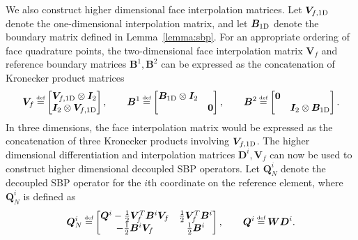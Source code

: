 \documentclass[onefignum,onetabnum,final]{siamart171218}
\newcommand\myeq{\mathrel{\stackrel{\makebox[0pt]{\mbox{\normalfont\tiny def}}}{=}}}
\begin{document}
We also construct higher dimensional face interpolation matrices.  Let $\bm{V}_{f, {\rm 1D}}$ denote the one-dimensional interpolation matrix, and let $\bm{B}_{\rm 1D}$ denote the boundary matrix defined in Lemma~\ref{lemma:sbp}.  For an appropriate ordering of face quadrature points, the two-dimensional face interpolation matrix $\bm{V}_f$ and reference boundary matrices ${\bm{B}}^1, {\bm{B}}^2$ can be expressed as the concatenation of Kronecker product matrices
\[
\bm{V}_f \myeq \begin{bmatrix}
\bm{V}_{f, {\rm 1D}} \otimes \bm{I}_{2}\\
\bm{I}_{2} \otimes \bm{V}_{f, {\rm 1D}} 
\end{bmatrix}, \qquad 
{\bm{B}}^1 \myeq \begin{bmatrix}
\bm{B}_{\rm 1D} \otimes \bm{I}_{2} & \\
& \bm{0}
\end{bmatrix}, \qquad 
{\bm{B}}^2 \myeq \begin{bmatrix}
\bm{0} &\\
& \bm{I}_{2} \otimes \bm{B}_{\rm 1D} 
\end{bmatrix}.
\]
In three dimensions, the face interpolation matrix would be expressed as the concatenation of three Kronecker products involving $\bm{V}_{f, {\rm 1D}}$.  The higher dimensional differentiation and interpolation matrices $\bm{D}^i, \bm{V}_f$ can now be used to construct higher dimensional decoupled SBP operators.  Let ${\bm{Q}}^i_N$ denote the decoupled SBP operator for the $i$th coordinate on the reference element, where ${\bm{Q}}^i_N$ is defined as
\[
{\bm{Q}}^i_N \myeq \begin{bmatrix}
{\bm{Q}}^i - \frac{1}{2}\bm{V}_f^T{\bm{B}}^i\bm{V}_f & \frac{1}{2}\bm{V}_f^T{\bm{B}}^i\\
-\frac{1}{2}{\bm{B}}^i\bm{V}_f & \frac{1}{2}{\bm{B}}^i
\end{bmatrix}, \qquad {\bm{Q}}^i \myeq {\bm{W}}{\bm{D}}^i.
\]
\end{document}
